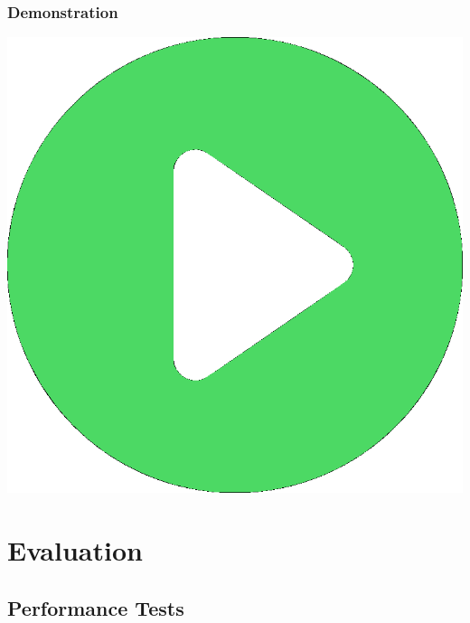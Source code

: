 \documentclass[compress]{beamer}
\begin{document}
  		\begin{frame}[c]
		\frametitle{Demonstration}
	
		\begin{center}
		\href{run:video.mkv}{
		\includegraphics[scale=0.25]
		{video.eps}}
		\end{center}


		\end{frame}



\section{Evaluation}\label{arch}


\subsection{Performance Tests}
\end{document}
